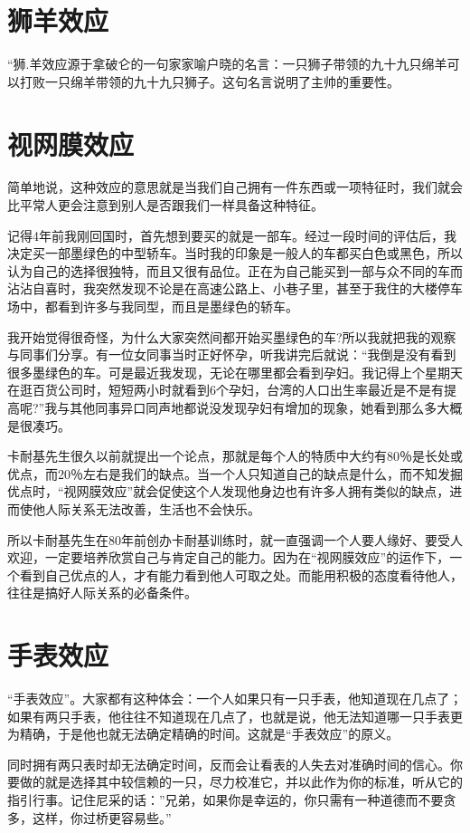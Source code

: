 \documentclass[11pt]{ctexart}
\begin{document}
\section{狮羊效应}
\label{sec-87}


“狮.羊效应源于拿破仑的一句家家喻户晓的名言：一只狮子带领的九十九只绵羊可以打败一只绵羊带领的九十九只狮子。这句名言说明了主帅的重要性。
\section{视网膜效应}
\label{sec-88}


简单地说，这种效应的意思就是当我们自己拥有一件东西或一项特征时，我们就会比平常人更会注意到别人是否跟我们一样具备这种特征。

记得4年前我刚回国时，首先想到要买的就是一部车。经过一段时间的评估后，我决定买一部墨绿色的中型轿车。当时我的印象是一般人的车都买白色或黑色，所以认为自己的选择很独特，而且又很有品位。正在为自己能买到一部与众不同的车而沾沾自喜时，我突然发现不论是在高速公路上、小巷子里，甚至于我住的大楼停车场中，都看到许多与我同型，而且是墨绿色的轿车。

我开始觉得很奇怪，为什么大家突然间都开始买墨绿色的车?所以我就把我的观察与同事们分享。有一位女同事当时正好怀孕，听我讲完后就说：“我倒是没有看到很多墨绿色的车。可是最近我发现，无论在哪里都会看到孕妇。我记得上个星期天在逛百货公司时，短短两小时就看到6个孕妇，台湾的人口出生率最近是不是有提高呢?”我与其他同事异口同声地都说没发现孕妇有增加的现象，她看到那么多大概是很凑巧。

卡耐基先生很久以前就提出一个论点，那就是每个人的特质中大约有80％是长处或优点，而20％左右是我们的缺点。当一个人只知道自己的缺点是什么，而不知发掘优点时，“视网膜效应”就会促使这个人发现他身边也有许多人拥有类似的缺点，进而使他人际关系无法改善，生活也不会快乐。

所以卡耐基先生在80年前创办卡耐基训练时，就一直强调一个人要人缘好、要受人欢迎，一定要培养欣赏自己与肯定自己的能力。因为在“视网膜效应”的运作下，一个看到自己优点的人，才有能力看到他人可取之处。而能用积极的态度看待他人，往往是搞好人际关系的必备条件。
\section{手表效应}
\label{sec-89}


“手表效应”。大家都有这种体会：一个人如果只有一只手表，他知道现在几点了；如果有两只手表，他往往不知道现在几点了，也就是说，他无法知道哪一只手表更为精确，于是他也就无法确定精确的时间。这就是“手表效应”的原义。

同时拥有两只表时却无法确定时间，反而会让看表的人失去对准确时间的信心。你要做的就是选择其中较信赖的一只，尽力校准它，并以此作为你的标准，听从它的指引行事。记住尼采的话：''兄弟，如果你是幸运的，你只需有一种道德而不要贪多，这样，你过桥更容易些。''
\end{document}
